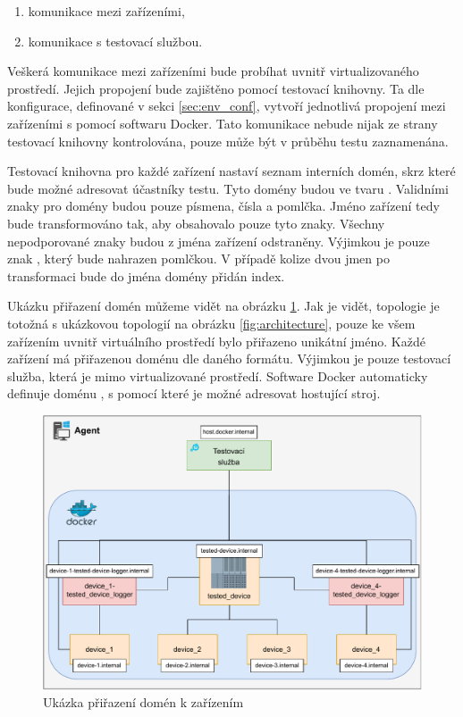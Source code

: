 \begin{enumerate}
    \item komunikace mezi zařízeními,
    \item komunikace s testovací službou.
\end{enumerate}

Veškerá komunikace mezi zařízeními bude probíhat uvnitř virtualizovaného prostředí. Jejich propojení bude zajištěno pomocí testovací knihovny. Ta dle konfigurace, definované v sekci \ref{sec:env_conf}, vytvoří jednotlivá propojení mezi zařízeními s pomocí softwaru Docker. Tato komunikace nebude nijak ze strany testovací knihovny kontrolována, pouze může být v průběhu testu zaznamenána. 

Testovací knihovna pro každé zařízení nastaví seznam interních domén, skrz které bude možné adresovat účastníky testu. Tyto domény budou ve tvaru . Validními znaky pro domény budou pouze písmena, čísla a pomlčka. Jméno zařízení tedy bude transformováno tak, aby obsahovalo pouze tyto znaky. Všechny nepodporované znaky budou z jména zařízení odstraněny. Výjimkou je pouze znak , který bude nahrazen pomlčkou. V případě kolize dvou jmen po transformaci bude do jména domény přidán index. 

Ukázku přiřazení domén můžeme vidět na obrázku \ref{fig:domain_resolving}. Jak je vidět, topologie je totožná s ukázkovou topologií na obrázku \ref{fig:architecture}, pouze ke všem zařízením uvnitř virtuálního prostředí bylo přiřazeno unikátní jméno. Každé zařízení má přiřazenou doménu dle daného formátu. Výjimkou je pouze testovací služba, která je mimo virtualizované prostředí. Software Docker automaticky definuje doménu , s pomocí které je možné adresovat hostující stroj.

\begin{figure}[htbp]
    \centering 
    \includegraphics[width=\textwidth]{assets/img/domain_resolving.pdf}
    \caption{Ukázka přiřazení domén k zařízením}
    \label{fig:domain_resolving}
\end{figure}


